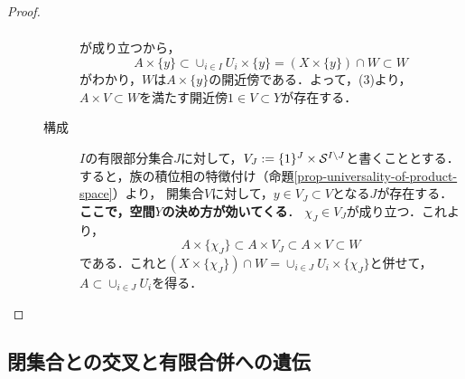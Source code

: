 \documentclass[uplatex,dvipdfmx]{jsreport}
\begin{document}
\begin{proof}
\begin{description}
\begin{description}
\begin{align*}
            \end{align*}
            が成り立つから，
            \[A\times\{y\}\subset\cup_{i\in I}U_i\times\{y\}=(X\times\{y\})\cap W\subset W\]
            がわかり，$W$は$A\times\{y\}$の開近傍である．よって，(3)より，$A\times V\subset W$を満たす開近傍$1\in V\subset Y$が存在する．
            \item[構成]
            $I$の有限部分集合$J$に対して，$V_J:=\{1\}^J\times\S^{I\setminus J}$と書くこととする．
            すると，族の積位相の特徴付け（命題\ref{prop-universality-of-product-space}）より，
            開集合$V$に対して，$y\in V_J\subset V$となる$J$が存在する．
            \textbf{ここで，空間$Y$の決め方が効いてくる}．
            $\chi_J\in V_J$が成り立つ．これより，
            \[A\times\{\chi_J\}\subset A\times V_J\subset A\times V\subset W\]
            である．これと$(X\times\{\chi_J\})\cap W=\cup_{i\in J}U_i\times\{\chi_J\}$と併せて，$A\subset\cup_{i\in J}U_i$を得る．
        \end{description}
    \end{description}
\end{proof}

\subsection{閉集合との交叉と有限合併への遺伝}
\end{document}
